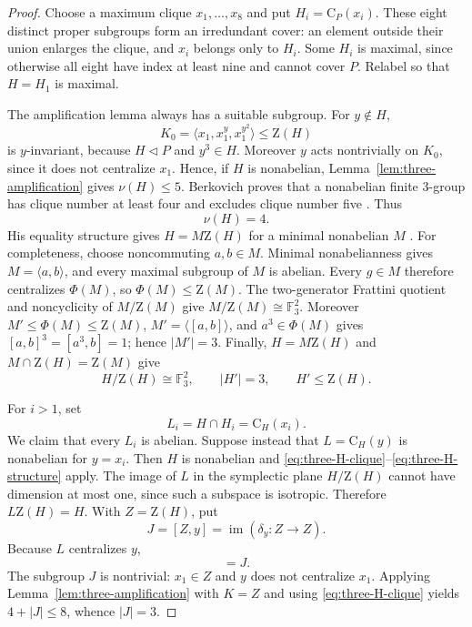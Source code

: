 \documentclass[11pt]{article}
\theoremstyle{remark}
\newcommand{\nuG}{\nu}
\newcommand{\F}{\mathbb F}
\newcommand{\Z}{\mathrm Z}
\newcommand{\CG}{\mathrm C}
\begin{document}
\begin{proof}
Choose a maximum clique $x_1,\ldots,x_8$ and put
$H_i=\CG_P(x_i)$.  These eight distinct proper subgroups form an
irredundant cover: an element outside their union enlarges the clique, and
$x_i$ belongs only to $H_i$.  Some $H_i$ is maximal, since otherwise all
eight have index at least nine and cannot cover $P$.  Relabel so that
$H=H_1$ is maximal.

The amplification lemma always has a suitable subgroup.  For $y\notin H$,
\[
 K_0=\langle x_1,x_1^y,x_1^{y^2}\rangle\le\Z(H)
\]
is $y$-invariant, because $H\mathrel{\triangleleft}P$ and $y^3\in H$.
Moreover $y$ acts nontrivially on $K_0$, since it does not centralize
$x_1$.  Hence, if $H$ is nonabelian, Lemma~\ref{lem:three-amplification}
gives $\nuG(H)\le5$.  Berkovich proves that a nonabelian finite
$3$-group has clique number at least four and excludes clique number five
\cite[Lemma~1.2, p.~416; Theorem~4.4, pp.~424--425]
{berkovich_2010_covers}.  Thus
\begin{equation}
 \nuG(H)=4.
\label{eq:three-H-clique}
\end{equation}
His equality structure gives $H=M\Z(H)$ for a minimal nonabelian $M$
\cite[Theorem~2.3, pp.~419--420]{berkovich_2010_covers}.  For completeness,
choose noncommuting $a,b\in M$.  Minimal nonabelianness gives
$M=\langle a,b\rangle$, and every maximal subgroup of $M$ is abelian.
Every $g\in M$ therefore centralizes $\Phi(M)$, so
$\Phi(M)\le\Z(M)$.  The two-generator Frattini quotient and
noncyclicity of $M/\Z(M)$ give $M/\Z(M)\cong\F_3^2$.  Moreover
$M'\le\Phi(M)\le\Z(M)$, $M'=\langle[a,b]\rangle$, and
$a^3\in\Phi(M)$ gives $[a,b]^3=[a^3,b]=1$; hence $|M'|=3$.
Finally, $H=M\Z(H)$ and $M\cap\Z(H)=\Z(M)$ give
\begin{equation}
 H/\Z(H)\cong\F_3^2,\qquad |H'|=3,\qquad H'\le\Z(H).
\label{eq:three-H-structure}
\end{equation}

For $i>1$, set
\[
 L_i=H\cap H_i=\CG_H(x_i).
\]
We claim that every $L_i$ is abelian.  Suppose instead that
$L=\CG_H(y)$ is nonabelian for $y=x_i$.  Then $H$ is nonabelian and
\eqref{eq:three-H-clique}--\eqref{eq:three-H-structure} apply.  The image of $L$ in the symplectic plane
$H/\Z(H)$ cannot have dimension at most one, since such a subspace is
isotropic.  Therefore $L\Z(H)=H$.  With $Z=\Z(H)$, put
\[
 J=[Z,y]=\operatorname{im}(\delta_y:Z\longrightarrow Z).
\]
Because $L$ centralizes $y$,
\begin{equation}
 [H,y]=J.
\label{eq:three-H-y}
\end{equation}
The subgroup $J$ is nontrivial: $x_1\in Z$ and $y$ does not centralize
$x_1$.  Applying Lemma~\ref{lem:three-amplification} with $K=Z$ and
using \eqref{eq:three-H-clique} yields $4+|J|\le8$, whence $|J|=3$.


\end{proof}
\end{document}
